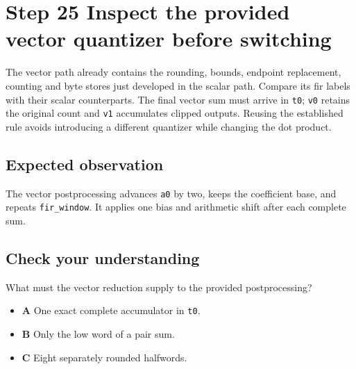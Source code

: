 \section{Step 25 Inspect the provided vector quantizer before switching}\label{fir-s25}

The vector path already contains the rounding, bounds, endpoint replacement, counting and byte stores just developed in the scalar path. Compare its fir labels with their scalar counterparts. The final vector sum must arrive in \texttt{t0}; \texttt{v0} retains the original count and \texttt{v1} accumulates clipped outputs. Reusing the established rule avoids introducing a different quantizer while changing the dot product.

\subsection{Expected observation}
The vector postprocessing advances \texttt{a0} by two, keeps the coefficient base, and repeats \texttt{fir\_window}. It applies one bias and arithmetic shift after each complete sum.

\subsection{Check your understanding}
What must the vector reduction supply to the provided postprocessing?

\begin{itemize}
  \item \textbf{A} One exact complete accumulator in \texttt{t0}.
  \item \textbf{B} Only the low word of a pair sum.
  \item \textbf{C} Eight separately rounded halfwords.
\end{itemize}
